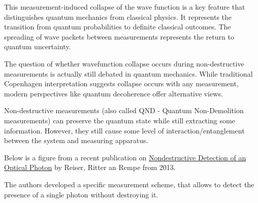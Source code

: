 \documentclass[
  a4paper,
]{book}
\begin{document}
This measurement-induced collapse of the wave function is a key feature
that distinguishes quantum mechanics from classical physics. It
represents the transition from quantum probabilities to definite
classical outcomes. The spreading of wave packets between measurements
represents the return to quantum uncertainty.

The question of whether wavefunction collapse occurs during
non-destructive measurements is actually still debated in quantum
mechanics. While traditional Copenhagen interpretation suggests collapse
occurs with any measurement, modern perspectives like quantum
decoherence offer alternative views.

Non-destructive measurements (also called QND - Quantum Non-Demolition
measurements) can preserve the quantum state while still extracting some
information. However, they still cause some level of
interaction/entanglement between the system and measuring apparatus.

Below is a figure from a recent publication on
\href{https://www.science.org/doi/epdf/10.1126/science.1246164}{Nondestructive
Detection of an Optical Photon} by Reiser, Ritter an Rempe from 2013.

The authors developed a specific measurement scheme, that allows to
detect the presence of a single photon without destroying it.
\end{document}
